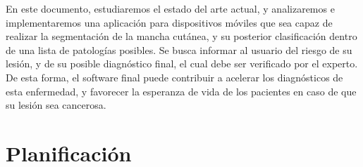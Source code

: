 En este documento, estudiaremos el estado del arte actual, y analizaremos e implementaremos una aplicación para dispositivos móviles que sea capaz de realizar la segmentación de la mancha cutánea, y su posterior clasificación dentro de una lista de patologías posibles. Se busca informar al usuario del riesgo de su lesión, y de su posible diagnóstico final, el cual debe ser verificado por el experto. De esta forma, el software final puede contribuir a acelerar los diagnósticos de esta enfermedad,  y favorecer la esperanza de vida de los pacientes en caso de que su lesión sea cancerosa.

\section{Planificación}
